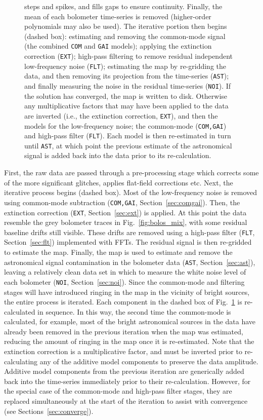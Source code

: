 \documentclass[useAMS,usenatbib,nofootinbib]{mn2e}
\newcommand{\model}[1]{\texttt{#1}}
\begin{document}
\begin{figure}
{  steps and spikes, and fills gaps to ensure continuity. Finally, the
  mean of each bolometer time-series is removed (higher-order
  polynomials may also be used). The iterative portion then begins
  (dashed box): estimating and removing the common-mode signal (the
  combined \model{COM} and \model{GAI} models); applying the
  extinction correction (\model{EXT}); high-pass filtering to remove
  residual independent low-frequency noise (\model{FLT}); estimating
  the map by re-gridding the data, and then removing its projection
  from the time-series (\model{AST}); and finally measuring the noise
  in the residual time-series (\model{NOI}). If the solution has
  converged, the map is written to disk. Otherwise any multiplicative
  factors that may have been applied to the data are inverted (i.e.,
  the extinction correction, \model{EXT}), and then the models for the
  low-frequency noise; the common-mode (\model{COM,GAI}) and high-pass
  filter (\model{FLT}). Each model is then re-estimated in turn until
  \model{AST}, at which point the previous estimate of the
  astronomical signal is added back into the data prior to its
  re-calculation.}
\label{fig:dimm}
\end{figure}

First, the raw data are passed through a pre-processing stage which
corrects some of the more significant glitches, applies flat-field
corrections etc. Next, the iterative process begins (dashed box). Most
of the low-frequency noise is removed using common-mode subtraction
(\model{COM,GAI}, Section~\ref{sec:comgai}). Then, the extinction
correction (\model{EXT}, Section~\ref{sec:ext}) is applied. At this
point the data resemble the grey bolometer traces in
Fig.~\ref{fig:bolos_mix}, with some residual baseline drifts still
visible. These drifts are removed using a high-pass filter
(\model{FLT}, Section~\ref{sec:flt}) implemented with FFTs. The
residual signal is then re-gridded to estimate the map. Finally, the
map is used to estimate and remove the astronomical signal
contamination in the bolometer data (\model{AST},
Section~\ref{sec:ast}), leaving a relatively clean data set in which
to measure the white noise level of each bolometer (\model{NOI},
Section~\ref{sec:noi}). Since the common-mode and filtering stages
will have introduced ringing in the map in the vicinity of bright
sources, the entire process is iterated. Each component in the dashed
box of Fig.~\ref{fig:dimm} is re-calculated in sequence. In this way,
the second time the common-mode is calculated, for example, most of
the bright astronomical sources in the data have already been removed
in the previous iteration when the map was estimated, reducing the
amount of ringing in the map once it is re-estimated. Note that the
extinction correction is a multiplicative factor, and must be inverted
prior to re-calculating any of the additive model components to
preserve the data amplitude. Additive model components from the
previous iteration are generically added back into the time-series
immediately prior to their re-calculation. However, for the special
case of the common-mode and high-pass filter stages, they are replaced
simultaneously at the start of the iteration to assist with
convergence (see Sections~\ref{sec:converge}).
\end{document}
